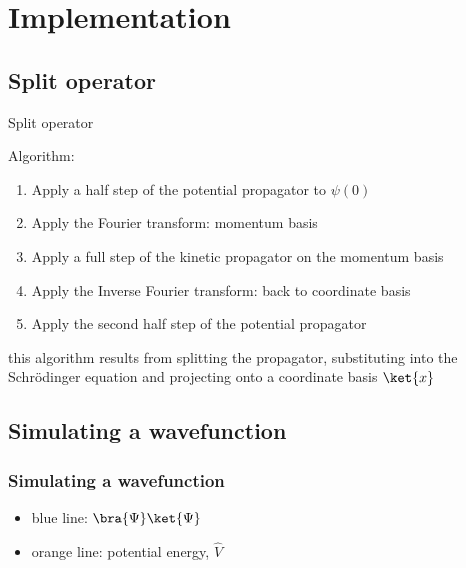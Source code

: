 \documentclass[10pt,a4paper]{beamer}
\begin{document}
\section{Implementation}
\subsection{Split operator}
\begin{frame}

\begin{Definition}
 Split operator
\end{Definition}
  
Algorithm: \\

\begin{enumerate}
\item Apply a half step of the potential propagator to $\psi(0)$ \\
\item Apply the Fourier transform: momentum basis \\
\item Apply a full step of the kinetic propagator on the momentum basis\\
\item Apply the Inverse Fourier transform: back to coordinate basis\\
\item Apply the second half step of the potential propagator\\
\end{enumerate}
\vspace{0.1in}
this algorithm results from splitting the propagator, substituting into the Schrödinger equation and projecting onto a coordinate basis $\ket{x}$
\end{frame}

\subsection{Simulating a wavefunction}
\begin{frame}
  \frametitle{Simulating a wavefunction}
  \begin{itemize}
  	\item blue line:  $\bra{\Psi}\ket{\Psi}$ 
  	\item orange line: potential energy, $\hat{V}$
  \end{itemize}
\end{frame}
\end{document}
